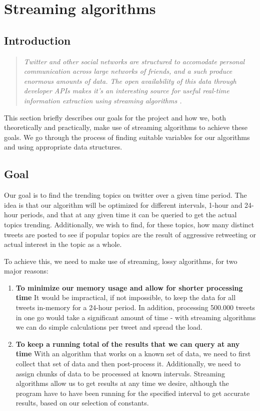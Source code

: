 \section{Streaming algorithms}\label{related work}
\subsection{Introduction}\label{algo-intro}
\begin{quote}\textit{
Twitter and other social networks are structured to accomodate personal communication across large networks of friends, and a such produce enormous amounts of data. The open availability of this data through developer APIs makes it's an interesting source for useful real-time information extraction using streaming algorithms \cite{genderprediction}. 
}
\end{quote}

This section briefly describes our goals for the project and how we, both theoretically and practically, make use of streaming algorithms to achieve these goals. We go through the process of finding suitable variables for our algorithms and using appropriate data structures.

\subsection{Goal}\label{algo-goals}
Our goal is to find the trending topics on twitter over a given time period. The idea is that our algorithm will be optimized for different intervals, 1-hour and 24-hour periods, and that at any given time it can be queried to get the actual topics trending. Additionally, we wish to find, for these topics, how many distinct tweets are posted to see if popular topics are the result of aggressive retweeting or actual interest in the topic as a whole.

To achieve this, we need to make use of streaming, lossy algorithms, for two major reasons:
\begin{enumerate}
    \item \textbf{To minimize our memory usage and allow for shorter processing time}
        It would be impractical, if not impossible, to keep the data for all tweets in-memory for a 24-hour period. In addition, processing 500.000 tweets in one go would take a significant amount of time - with streaming algorithms we can do simple calculations per tweet and spread the load.

    \item \textbf{To keep a running total of the results that we can query at any time}
        With an algorithm that works on a known set of data, we need to first collect that set of data and then post-process it. Additionally, we need to assign chunks of data to be processed at known intervals. Streaming algorithms allow us to get results at any time we desire, although the program have to have been running for the specified interval to get accurate results, based on our selection of constants.
\end{enumerate}

